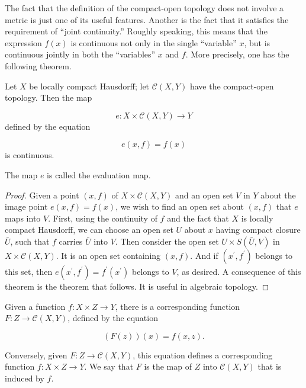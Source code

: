The fact that the definition of the compact-open topology does not involve a metric is just one of its useful features. Another is the fact that it satisfies the requirement of ``joint continuity.'' Roughly speaking, this means that the expression \(f(x)\) is continuous not only in the single ``variable'' \(x\), but is continuous jointly in both the ``variables'' \(x\) and \(f\). More precisely, one has the following theorem.

\begin{theorem}
\label{thm:\thetheorem}
Let \(X\) be locally compact Hausdorff; let \(\mathcal{C}({X,Y})\) have the compact-open topology. Then the map

\[
e : X \times \mathcal{C}({X,Y}) \rightarrow Y
\]
defined by the equation

\[
e({x,f}) = f(x)
\]
is continuous.

The map \(e\) is called the evaluation map.
\end{theorem}

\begin{proof}
Given a point \((x, f)\) of \(X \times \mathcal{C}({X,Y})\) and an open set \(V\) in \(Y\) about the image point \(e({x,f}) = f(x)\), we wish to find an open set about \((x, f)\) that \(e\) maps into \(V\). First, using the continuity of \(f\) and the fact that \(X\) is locally compact Hausdorff, we can choose an open set \(U\) about \(x\) having compact closure \(\bar{U}\), such that \(f\) carries \(\bar{U}\) into \(V\). Then consider the open set \(U \times S({\bar{U},V})\) in \(X \times \mathcal{C}({X,Y})\). It is an open set containing \((x, f)\). And if \(({x^{\prime },f^{\prime }})\) belongs to this set, then \(e({x^{\prime },f^{\prime }}) = f^{\prime }(x^{\prime })\) belongs to \(V\), as desired.
A consequence of this theorem is the theorem that follows. It is useful in algebraic topology.
\end{proof}
\begin{definition}
Given a function \(f : X \times Z \rightarrow Y\), there is a corresponding function \(F : Z \rightarrow \mathcal{C}({X,Y})\), defined by the equation

\[
({F( z) }) (x) = f({x,z}).
\]

Conversely, given \(F : Z \rightarrow \mathcal{C}({X,Y})\), this equation defines a corresponding function \(f : X \times Z \rightarrow Y\). We say that \(F\) is the map of \(Z\) into \(\mathcal{C}({X,Y})\) that is induced by \(f\).
\end{definition}

